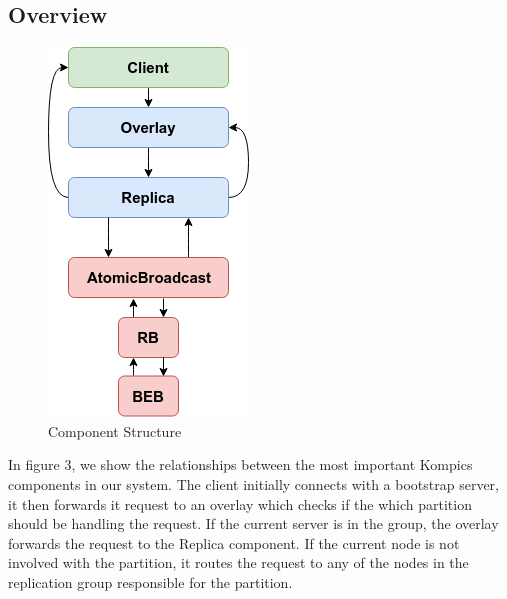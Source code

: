 \documentclass[12pt]{article}
\begin{document}
\subsection{Overview}
\begin{figure}[H]
  \centering
  \includegraphics[scale=0.90]{img/components.png}
  \caption[Caption for LOF]{Component Structure}  
  \label{fig:picture}
\end{figure}
In figure 3, we show the relationships between the most important Kompics components in our system. The client initially connects with a bootstrap server, it then forwards it request to an overlay which checks if the which partition should be handling the request. If the current server is in the group, the overlay forwards the request to the Replica component. If the current node is not involved with the partition, it routes the request to any of the nodes in the replication group responsible for the partition.
\end{document}
